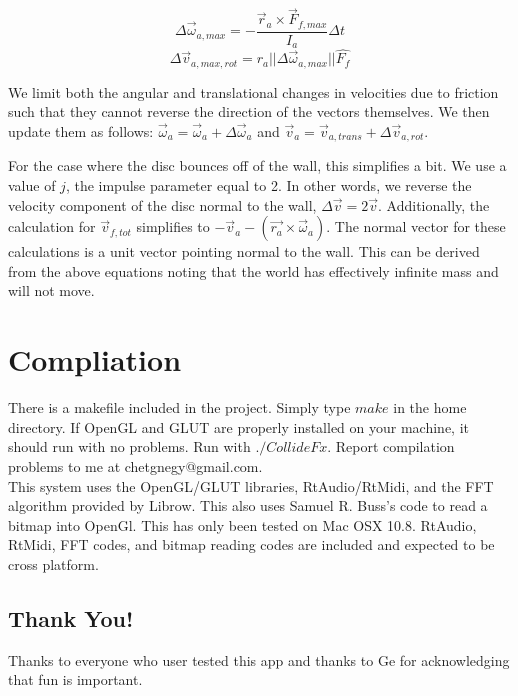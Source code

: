 \documentclass[pdftext,twoside,10pt]{article}
\begin{document}
\begin{equation}
\Delta\vec{\omega}_{a,max} = - \frac{\vec{r}_a\times \vec{F}_{f,max}}{I_a}\Delta t
 \label{ang}
\end{equation}
\begin{equation}
\Delta\vec{v}_{a,max,rot} = r_a||\Delta\vec{\omega}_{a,max}||\hat{F_f}
 \label{tea}
\end{equation}


We limit both the angular and translational changes in velocities due to friction such that they cannot reverse the direction of the vectors themselves. We then update them as follows: $\vec{\omega}_a = \vec{\omega}_a + \Delta\vec{\omega}_a$ and $\vec{v}_a = \vec{v}_{a,trans} + \Delta\vec{v}_{a,rot}$.

For the case where the disc bounces off of the wall, this simplifies a bit. We use a value of $j$, the impulse parameter equal to 2. In other words, we reverse the velocity component of the disc normal to the wall, $
\Delta\vec{v} = 2\vec{v}$.  Additionally, the calculation for $\vec{v}_{f,tot}$ simplifies to $ - \vec{v}_a - (\vec{r_a}\times\vec{\omega}_a)$. The normal vector for these calculations is a unit vector pointing normal to the wall. This can be derived from the above equations noting that the world has effectively infinite mass and will not move.

\vspace{1cm}

\section{Compliation}
There is a makefile included in the project. Simply type $make$ in the home directory. If OpenGL and GLUT are properly installed on your machine, it should run with no problems. Run with $./CollideFx$. Report compilation problems to me at chetgnegy@gmail.com.\\

This system uses the OpenGL/GLUT libraries, RtAudio/RtMidi, and the FFT algorithm provided by Librow. This also uses Samuel R. Buss's code to read a bitmap into OpenGl. This has only been tested on Mac OSX 10.8. RtAudio, RtMidi, FFT codes, and bitmap reading codes are included and expected to be cross platform.

\vspace{1cm}


\subsection*{Thank You!}
Thanks to everyone who user tested this app and thanks to Ge for acknowledging that fun is important.
\end{document}
